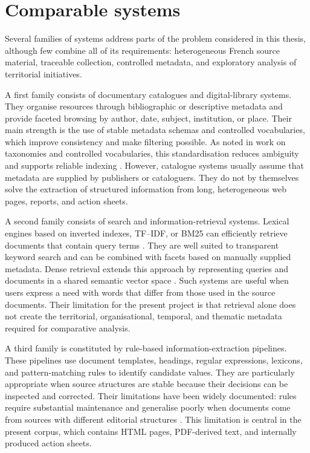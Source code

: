 
\section{Comparable systems}

Several families of systems address parts of the problem considered in this
thesis, although few combine all of its requirements: heterogeneous French
source material, traceable collection, controlled metadata, and exploratory
analysis of territorial initiatives.

A first family consists of documentary catalogues and digital-library systems.
They organise resources through bibliographic or descriptive metadata and
provide faceted browsing by author, date, subject, institution, or place. Their
main strength is the use of stable metadata schemas and controlled vocabularies,
which improve consistency and make filtering possible. As noted in work on
taxonomies and controlled vocabularies, this standardisation reduces ambiguity
and supports reliable indexing \citep{hedden2016taxonomy}. However, catalogue
systems usually assume that metadata are supplied by publishers or cataloguers.
They do not by themselves solve the extraction of structured information from
long, heterogeneous web pages, reports, and action sheets.

A second family consists of search and information-retrieval systems. Lexical
engines based on inverted indexes, TF--IDF, or BM25 can efficiently retrieve
documents that contain query terms \citep{salton1988term,robertson2009probabilistic}.
They are well suited to transparent keyword search and can be combined with
facets based on manually supplied metadata. Dense retrieval extends this
approach by representing queries and documents in a shared semantic vector
space \citep{karpukhin2020dense}. Such systems are useful when users express a
need with words that differ from those used in the source documents. Their
limitation for the present project is that retrieval alone does not create the
territorial, organisational, temporal, and thematic metadata required for
comparative analysis.

A third family is constituted by rule-based information-extraction pipelines.
These pipelines use document templates, headings, regular expressions,
lexicons, and pattern-matching rules to identify candidate values. They are
particularly appropriate when source structures are stable because their
decisions can be inspected and corrected. Their limitations have been widely
documented: rules require substantial maintenance and generalise poorly when
documents come from sources with different editorial structures
\citep{sarawagi2008information,grishman2019information}. This limitation is
central in the present corpus, which contains HTML pages, PDF-derived text, and
internally produced action sheets.


